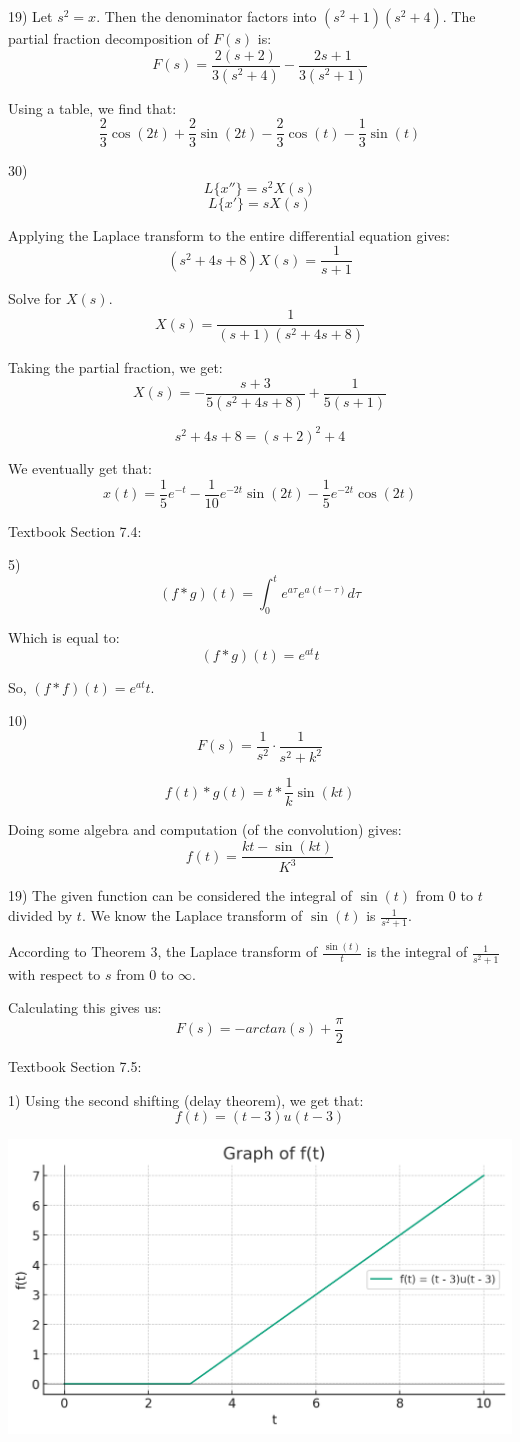 \documentclass{article}
\begin{document}
19) Let $s^2 = x$. Then the denominator factors into $(s^2 + 1)(s^2 + 4)$.
The partial fraction decomposition of $F(s)$ is:
\[F(s) = \frac{2(s+2)}{3(s^2 + 4)} - \frac{2s+1}{3(s^2 + 1)}\]

Using a table, we find that:
\[\frac{2}{3} \cos(2t) + \frac{2}{3} \sin(2t) - \frac{2}{3} \cos(t) - \frac{1}{3} \sin(t)\]

30)
\[L\{x''\} = s^2 X(s)\]
\[L\{x'\} = s X(s)\]

Applying the Laplace transform to the entire differential equation gives:
\[(s^2 + 4s + 8) X(s) = \frac{1}{s+1}\]

Solve for $X(s)$.
\[X(s) = \frac{1}{(s+1)(s^2 + 4s + 8)}\]

Taking the partial fraction, we get:
\[X(s) = -\frac{s+3}{5(s^2 + 4s + 8)} + \frac{1}{5(s+1)}\]

\[s^2 + 4s + 8 = (s+2)^2 + 4\]

We eventually get that:
\[x(t) = \frac{1}{5} e^{-t} - \frac{1}{10} e^{-2t} \sin(2t) - \frac{1}{5} e^{-2t} \cos(2t)\]


Textbook Section 7.4:

5)
\[(f * g)(t) = \int_{0}^{t} e^{a \tau} e^{a (t - \tau)} d \tau\]

Which is equal to:
\[(f * g)(t) = e^{at} t\]

So, $(f*f)(t) = e^{at} t$.

10)
\[F(s) = \frac{1}{s^2} \cdot \frac{1}{s^2 + k^2}\]

\[f(t) * g(t) = t * \frac{1}{k} \sin(kt)\]

Doing some algebra and computation (of the convolution) gives:
\[f(t) = \frac{kt - \sin(kt)}{K^3}\]


19) The given function can be considered the integral of $\sin(t)$ from $0$ to
$t$ divided by $t$. We know the Laplace transform of $\sin(t)$ is $\frac{1}{s^2 + 1}$.

According to Theorem 3, the Laplace transform of $\frac{\sin(t)}{t}$ is the integral of
$\frac{1}{s^2 + 1}$ with respect to $s$ from $0$ to $\infty$.

Calculating this gives us:
\[F(s) = -arctan(s) + \frac{\pi}{2}\]


Textbook Section 7.5:

1) Using the second shifting (delay theorem), we get that:
\[f(t) = (t-3) u(t-3)\]

\includegraphics[width=\linewidth]{7_5_1}
\end{document}
